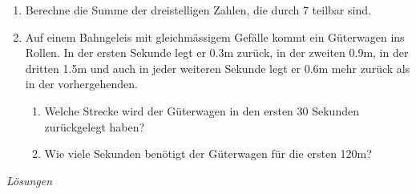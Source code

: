\begin{ueb}{}{}
\begin{enumerate}
    \item Berechne die Summe der dreistelligen Zahlen, die durch 7 teilbar sind.
    \item Auf einem Bahngeleis mit gleichmässigem Gefälle kommt ein Güterwagen ins Rollen. In der ersten Sekunde legt er 0.3m zurück, in der zweiten 0.9m, in der dritten 1.5m und auch in jeder weiteren Sekunde legt er 0.6m mehr zurück als in der vorhergehenden. 

    \begin{enumerate}
        \item Welche Strecke wird der Güterwagen in den ersten 30 Sekunden zurückgelegt haben?
        \item Wie viele Sekunden benötigt der Güterwagen für die ersten 120m?
    \end{enumerate}
    
    \end{enumerate}
\end{ueb}

\clearpage
\emph{Lösungen}


